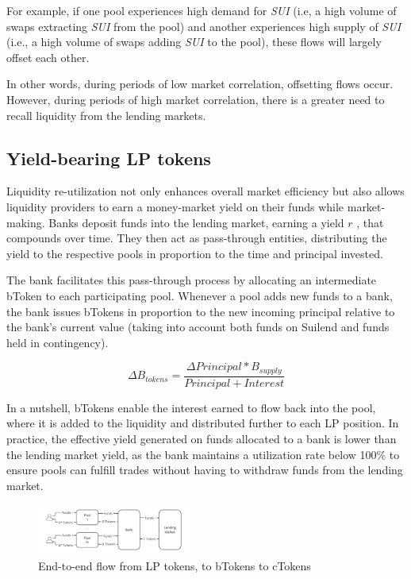 \documentclass[sigconf,nonacm,prologue,table]{acmart}
\numberwithin{equation}{section}
\theoremstyle{definition}
\theoremstyle{remark}
\begin{document}
For example, if one pool experiences high demand for \emph{SUI} (i.e, a high volume of swaps extracting \emph{SUI} from the pool) and another experiences high supply of \emph{SUI} (i.e., a high volume of swaps adding \emph{SUI} to the pool), these flows will largely offset each other.

In other words, during periods of low market correlation, offsetting flows occur. However, during periods of high market correlation, there is a greater need to recall liquidity from the lending markets.

\subsection{Yield-bearing LP tokens} \label{yieldbearingtokens}
Liquidity re-utilization not only enhances overall market efficiency but also allows liquidity providers to earn a money-market yield on their funds while market-making. Banks deposit funds into the lending market, earning a yield $r$ , that compounds over time. They then act as pass-through entities, distributing the yield to the respective pools in proportion to the time and principal invested.

The bank facilitates this pass-through process by allocating an intermediate bToken to each participating pool. Whenever a pool adds new funds to a bank, the bank issues bTokens in proportion to the new incoming principal relative to the bank’s current value (taking into account both funds on Suilend and funds held in contingency).

\begin{equation}
\Delta{B_{tokens}} = \frac{\Delta{Principal} *B_{supply} }{Principal + Interest}
\tag{2.1}
\end{equation}

In a nutshell, bTokens enable the interest earned to flow back into the pool, where it is added to the liquidity and distributed further to each LP position.
In practice, the effective yield generated on funds allocated to a bank is lower than the lending market yield, as the bank maintains a utilization rate below 100\% to ensure pools can fulfill trades without having to withdraw funds from the lending market.

\begin{figure}[htbp]
  \centering
  \includegraphics[width=0.45\textwidth]{assets/btokens.png}
  \caption{End-to-end flow from LP tokens, to bTokens to cTokens}
  \label{fig:utilization}
\end{figure}
\end{document}
